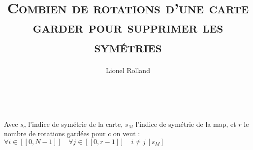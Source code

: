 \documentclass[10pt]{article}
\title{\textsc{Combien de rotations d'une carte garder pour supprimer les symétries}}
\author{Lionel Rolland}
\date{\the\day \ \monthname \ \the\year}
\begin{document}
\maketitle

Avec $s_{c}$ l'indice de symétrie de la carte, $s_{M}$ l'indice de symétrie de la map, et $r$ le nombre de rotations gardées pour $c$ on veut : $\forall i \in [\![0, N-1]\!] \quad \forall j \in [\![0, r-1]\!] \quad i \neq j \ [s_{M}]$
\end{document}
